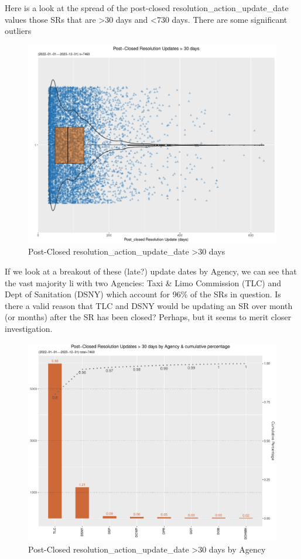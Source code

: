 \documentclass[12pt, titlepage]{article}
\begin{document}
{	Here is a look at the spread of the post-closed resolution\_action\_update\_date values those SRs 
	that are \textgreater{}30 days and \textless{}730 days. There are some significant outliers 
	
	\begin{figure}[H]
		 \centering
		 \includegraphics[width = \textwidth]{post_closed_violin.pdf}
		 \caption{Post-Closed resolution\_action\_update\_date >30 days }
		 \label{fig:resolution-violin}
	\end{figure}		

	If we look at a breakout of these (late?) update dates by Agency, we can see that the vast majority li with two
	Agencies: Taxi \& Limo Commission (TLC) and Dept of Sanitation (DSNY) which account for 96\% of the SRs in
	question.  Is there a valid reason that TLC and DSNY would be updating an SR over month (or months) after
	the SR has been closed? Perhaps, but it seems to merit closer investigation. 

	\begin{figure}[H]
		 \centering
		 \includegraphics[width = \textwidth]{postClosedBarChart.pdf}
		 \caption{Post-Closed resolution\_action\_update\_date >30 days by Agency }
		 \label{fig:resolution-by-agency}
	\end{figure}		

}
\end{document}
